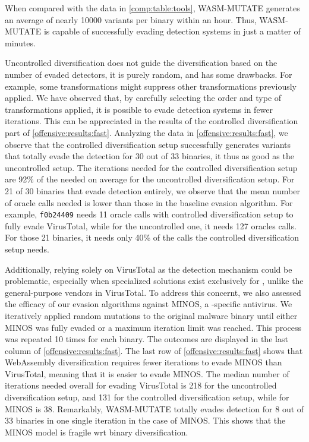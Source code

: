 \begin{tcolorbox}[title=Takeaway,boxrule=1pt,arc=.2em,boxsep=1.0mm]
    When compared with the data in \autoref{comp:table:tools},   WASM-MUTATE generates an average of nearly 10000 variants per binary within an hour. 
    Thus, WASM-MUTATE is capable of successfully evading detection systems in just a matter of minutes.
\end{tcolorbox}

  Uncontrolled diversification does not guide the diversification based on the number of evaded detectors, it is purely random, and has some drawbacks.
For example, some transformations might suppress other transformations previously applied.
We have observed that, by carefully selecting the order and type of transformations applied, it is possible to evade detection systems in fewer iterations.
This can be appreciated in the results of the controlled diversification part of \autoref{offensive:results:fast}.
Analyzing the data in \autoref{offensive:results:fast}, we observe that the controlled diversification setup successfully generates variants that totally evade the detection for 30 out of 33 binaries, it thus as good as the uncontrolled setup.
The iterations needed for the controlled diversification setup are 92\% of the needed on average for the uncontrolled diversification setup.
For 21 of 30 binaries that evade detection entirely, we observe that the mean number of oracle calls needed is lower than those in the baseline evasion algorithm.
For example, \texttt{f0b24409} needs 11 oracle calls with controlled diversification setup to fully evade VirusTotal, while for the uncontrolled one, it needs 127 oracles calls.
For those 21 binaries, it needs only 40\% of the calls the controlled diversification setup needs.

Additionally, relying solely on VirusTotal as the detection mechanism could be problematic, especially when specialized solutions exist exclusively for \Wasm, unlike the general-purpose vendors in VirusTotal. 
To address this concernt, we also assessed the efficacy of our evasion algorithms against MINOS, a \Wasm-specific antivirus. 
We iteratively applied random mutations to the original malware binary until either MINOS was fully evaded or a maximum iteration limit was reached. 
This process was repeated 10 times for each binary. 
The outcomes are displayed in the last column of \autoref{offensive:results:fast}.
The last row of \autoref{offensive:results:fast} shows that WebAssembly diversification requires fewer iterations to evade MINOS than VirusTotal, meaning that it is easier to evade MINOS.
The median number of iterations needed overall for evading VirusTotal is 218 for the uncontrolled diversification setup, and 131 for the controlled diversification setup, while for MINOS is 38.
Remarkably, WASM-MUTATE totally evades detection for 8 out of 33 binaries in one single iteration in the case of MINOS.
This shows that the MINOS model is fragile wrt binary diversification. 


